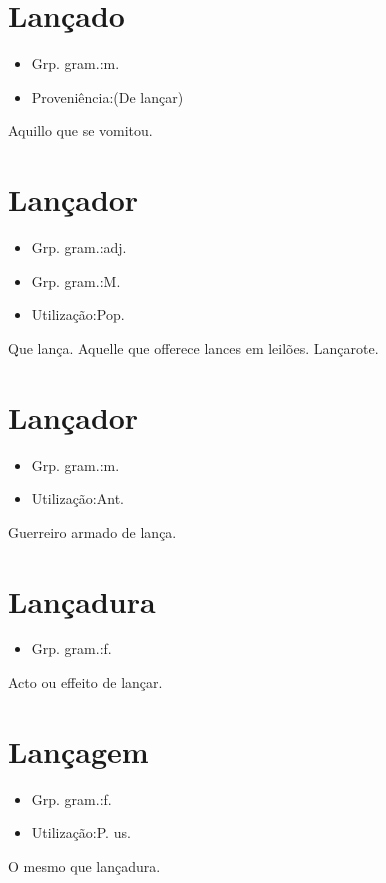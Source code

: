 \section{Lançado}
\begin{itemize}
\item {Grp. gram.:m.}
\end{itemize}
\begin{itemize}
\item {Proveniência:(De \textunderscore lançar\textunderscore )}
\end{itemize}
Aquillo que se vomitou.
\section{Lançador}
\begin{itemize}
\item {Grp. gram.:adj.}
\end{itemize}
\begin{itemize}
\item {Grp. gram.:M.}
\end{itemize}
\begin{itemize}
\item {Utilização:Pop.}
\end{itemize}
Que lança.
Aquelle que offerece lances em leilões.
Lançarote.
\section{Lançador}
\begin{itemize}
\item {Grp. gram.:m.}
\end{itemize}
\begin{itemize}
\item {Utilização:Ant.}
\end{itemize}
Guerreiro armado de lança.
\section{Lançadura}
\begin{itemize}
\item {Grp. gram.:f.}
\end{itemize}
Acto ou effeito de lançar.
\section{Lançagem}
\begin{itemize}
\item {Grp. gram.:f.}
\end{itemize}
\begin{itemize}
\item {Utilização:P. us.}
\end{itemize}
O mesmo que \textunderscore lançadura\textunderscore .
